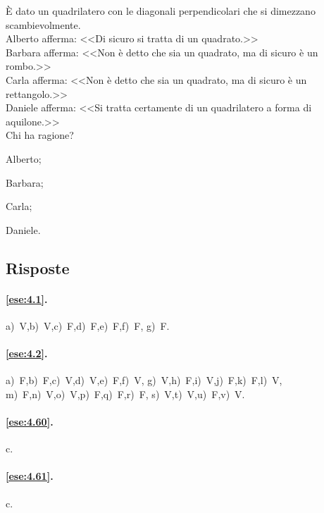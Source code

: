 \begin{esercizio}
\label{ese:4.67}
\`E dato un quadrilatero con le diagonali perpendicolari che si 
dimezzano scambievolmente.\\
Alberto afferma: <<Di sicuro si tratta di un quadrato.>>\\
Barbara afferma: <<Non è detto che sia un quadrato, ma di sicuro è un 
rombo.>>\\
Carla afferma: <<Non è detto che sia un quadrato, ma di sicuro è un 
rettangolo.>>\\
Daniele afferma: <<Si tratta certamente di un quadrilatero a forma di 
aquilone.>>\\
Chi ha ragione?
\begin{multicols}{4}
\begin{enumeratea}
\item Alberto;
\item Barbara;
\item Carla;
\item Daniele.
\end{enumeratea}
\end{multicols}
\end{esercizio}

\subsection{Risposte}

\begingroup
\hypersetup{linkcolor=black}

\paragraph{\ref{ese:4.1}.}
a)~V,\quad b)~V,\quad c)~F,\quad d)~F,\quad e)~F,\quad f)~F,\quad 
g)~F.

\paragraph{\ref{ese:4.2}.}
a)~F,\quad b)~F,\quad c)~V,\quad d)~V,\quad e)~F,\quad f)~V,\quad 
g)~V,\quad h)~F,\quad i)~V,\quad j)~F,\quad k)~F,\quad l)~V,\quad 
m)~F,\quad n)~V,\quad o)~V,\quad p)~F,\quad q)~F,\quad r)~F,\quad 
s)~V,\quad t)~V,\quad u)~F,\quad v)~V.

\paragraph{\ref{ese:4.60}.}
c.

\paragraph{\ref{ese:4.61}.}
c.

